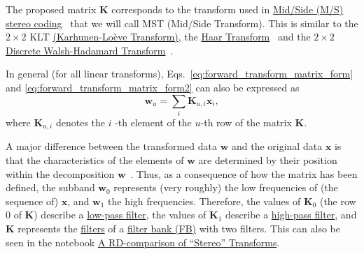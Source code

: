 The proposed matrix ${\mathbf K}$ corresponds to the transform used in
\href{https://en.wikipedia.org/wiki/Joint_encoding#M/S_stereo_coding}{Mid/Side
  (M/S) stereo coding}~\cite{bosi2003intro} that we will call MST
(Mid/Side Transform). This is similar to the $2\times 2$ KLT
\href{https://en.wikipedia.org/wiki/Kosambi%E2%80%93Karhunen%E2%80%93Lo%C3%A8ve_theorem}{(Karhunen-Lo\`eve
  Transform)}, the
\href{http://wavelets.pybytes.com/wavelet/haar/}{Haar
  Transform}~\cite{vetterli1995wavelets} and the $2\times 2$
\href{https://en.wikipedia.org/wiki/Hadamard_transform}{Discrete
  Walsh-Hadamard Transform}~\cite{sayood2017introduction}.

In general (for all linear transforms),
Eqs.~\eqref{eq:forward_transform_matrix_form} and
\eqref{eq:forward_transform_matrix_form2} can also be expressed as
\begin{equation}
  {\mathbf w}_u = \sum_i {\mathbf K}_{u,i}{\mathbf x}_i,
  \label{eq:forward_transform_linear_combination_form}
\end{equation}
where ${\mathbf K}_{u,i}$ denotes the $i$ -th element of the $u$-th row of
the matrix ${\mathbf K}$.

A major difference between the transformed data ${\mathbf w}$ and the
original data ${\mathbf x}$ is that the characteristics of the
elements of ${\mathbf w}$ are determined by their position within the
decomposition ${\mathbf w}$~\cite{sayood2017introduction}. Thus, as a
consequence of how the matrix has been defined, the subband ${\mathbf
  w}_0$ represents (very roughly) the low frequencies of (the sequence of) ${\mathbf
  x}$, and ${\mathbf w}_1$ the high frequencies. Therefore, the values
of ${\mathbf K}_0$ (the row 0 of ${\mathbf K}$) describe a
\href{https://en.wikipedia.org/wiki/Low-pass_filter}{low-pass filter},
the values of ${\mathbf K}_1$ describe a
\href{https://en.wikipedia.org/wiki/High-pass_filter}{high-pass
  filter}, and ${\mathbf K}$ represents the
\href{https://en.wikipedia.org/wiki/Digital_filter}{filters} of a
\href{https://en.wikipedia.org/wiki/Filter_bank}{filter bank (FB)} with two
filters. This can also be seen in the notebook
\href{https://github.com/Tecnologias-multimedia/Tecnologias-multimedia.github.io/blob/master/contents/transform_coding/stereo_transforms_RD.ipynb}{A RD-comparison of ``Stereo'' Transforms}.

